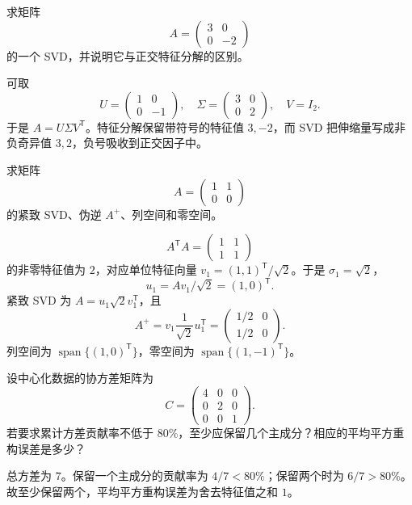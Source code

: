 \begin{exercise}[level=standard]
求矩阵
\[
A=\begin{pmatrix}3&0\\0&-2\end{pmatrix}
\]
的一个 SVD，并说明它与正交特征分解的区别。
\begin{solution}
可取
\[
U=\begin{pmatrix}1&0\\0&-1\end{pmatrix},
\quad
\Sigma=\begin{pmatrix}3&0\\0&2\end{pmatrix},
\quad
V=I_2.
\]
于是 $A=U\Sigma V^{\mathsf T}$。特征分解保留带符号的特征值 $3,-2$，而 SVD 把伸缩量写成非负奇异值 $3,2$，负号吸收到正交因子中。
\end{solution}
\end{exercise}

\begin{exercise}[level=standard]
求矩阵
\[
A=\begin{pmatrix}1&1\\0&0\end{pmatrix}
\]
的紧致 SVD、伪逆 $A^+$、列空间和零空间。
\begin{solution}
\[
A^{\mathsf T}A=\begin{pmatrix}1&1\\1&1\end{pmatrix}
\]
的非零特征值为 $2$，对应单位特征向量 $v_1=(1,1)^{\mathsf T}/\sqrt2$。于是 $\sigma_1=\sqrt2$，
\[
u_1=Av_1/\sqrt2=(1,0)^{\mathsf T}.
\]
紧致 SVD 为 $A=u_1\sqrt2v_1^{\mathsf T}$，且
\[
A^+=v_1\frac1{\sqrt2}u_1^{\mathsf T}
=\begin{pmatrix}1/2&0\\1/2&0\end{pmatrix}.
\]
列空间为 $\operatorname{span}\{(1,0)^{\mathsf T}\}$，零空间为 $\operatorname{span}\{(1,-1)^{\mathsf T}\}$。
\end{solution}
\end{exercise}

\begin{exercise}[level=standard]
设中心化数据的协方差矩阵为
\[
C=\begin{pmatrix}4&0&0\\0&2&0\\0&0&1\end{pmatrix}.
\]
若要求累计方差贡献率不低于 $80\%$，至少应保留几个主成分？相应的平均平方重构误差是多少？
\begin{solution}
总方差为 $7$。保留一个主成分的贡献率为 $4/7<80\%$；保留两个时为 $6/7>80\%$。故至少保留两个，平均平方重构误差为舍去特征值之和 $1$。
\end{solution}
\end{exercise}

